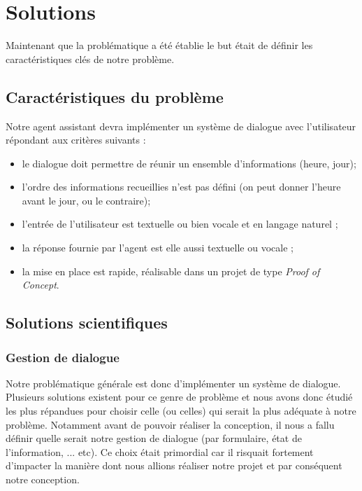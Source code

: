 \chapter{Solutions}

Maintenant que la problématique a été établie le but était de définir les caractéristiques clés de notre problème.


\section{Caractéristiques du problème}
Notre agent assistant devra implémenter un système de dialogue avec l'utilisateur répondant aux critères suivants :
\begin{itemize}
	\item le dialogue doit permettre de réunir un ensemble d'informations (heure, jour);
 	\item l'ordre des informations recueillies n'est pas défini (on peut donner l'heure avant le jour, ou le contraire);
 	\item l'entrée de l'utilisateur est textuelle ou bien vocale et en langage naturel ;
 	\item la réponse fournie par l'agent est elle aussi textuelle ou vocale ;
 	\item la mise en place est rapide, réalisable dans un projet de type \textit{Proof of Concept}.
\end{itemize}

\section{Solutions scientifiques}

\subsection{Gestion de dialogue}
Notre problématique générale est donc d'implémenter un système de dialogue. Plusieurs solutions existent pour ce genre de problème et nous avons donc étudié les plus répandues pour choisir celle (ou celles) qui serait la plus adéquate à notre problème. Notamment avant de pouvoir réaliser la conception, il nous a fallu définir quelle serait notre gestion de dialogue (par formulaire, état de l'information, ... etc). Ce choix était primordial car il risquait fortement d'impacter la manière dont nous allions réaliser notre projet et par conséquent notre conception.


\FloatBarrier


